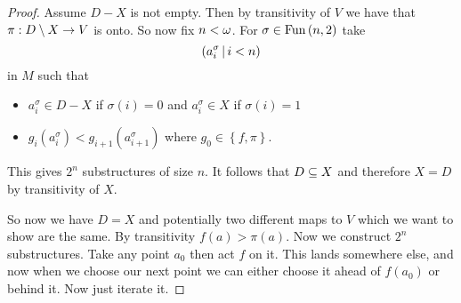 \documentclass{amsart}
\begin{document}
\begin{proof}
Assume $D\minus X$ is not empty. Then by transitivity of $V$ we have that $\pi: D\setminus X
\rightarrow V$ is onto. So now fix $n < \omega$. 
For $\sigma \in \operatorname{Fun}\left(n , 2\right)$ take
\begin{equation}
\left(a_i^\sigma \, \middle\vert \, i < n\right)
\end{equation}
in $M$ such that 
\begin{itemize}
\item $a_i^\sigma\in D\minus X$ if $\sigma\left(i\right) = 0$ and $a_i^\sigma\in X$ if
$\sigma\left(i\right) = 1$
\item $g_i\left(a_i^\sigma\right) < g_{i+1}\left(a_{i+1}^\sigma\right)$ where $g_0\in
\left\{f , \pi\right\}$.
\end{itemize}
This gives $2^n$ substructures of size $n$. It follows that $D\subseteq X$ and therefore $X =
D$ by transitivity of $X$.

So now we have $D = X$ and potentially two different maps to $V$ which we want to show are
the same. 
By transitivity $f\left(a\right) > \pi\left(a\right)$. 
Now we construct $2^n$ substructures. Take any point $a_0$ then act $f$ on it. This lands
somewhere else, and now when we choose our next point we can either choose it ahead of
$f\left(a_0\right)$ or behind it. Now just iterate it.
\end{proof}
\end{document}
